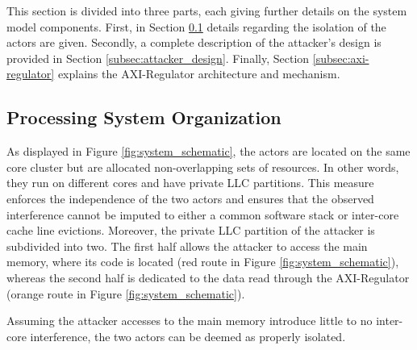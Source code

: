     This section is divided into three parts, each giving further details on the system model components.
    First, in Section \ref{subsec:processing_system_organization} details regarding the isolation of the actors are given.
    Secondly, a complete description of the attacker's design is provided in Section \ref{subsec:attacker_design}.
    Finally, Section \ref{subsec:axi-regulator} explains the AXI-Regulator architecture and mechanism.

    \subsection{Processing System Organization}
        \label{subsec:processing_system_organization}
        As displayed in Figure \ref{fig:system_schematic}, the actors are located on the same core cluster but are allocated non-overlapping sets of resources.
        In other words, they run on different cores and have private LLC partitions.
        This measure enforces the independence of the two actors and ensures that the observed interference cannot be imputed to either a common software stack or inter-core cache line evictions.
        Moreover, the private LLC partition of the attacker is subdivided into two.
        The first half allows the attacker to access the main memory, where its code is located (red route in Figure \ref{fig:system_schematic}), whereas the second half is dedicated to the data read through the AXI-Regulator (orange route in Figure \ref{fig:system_schematic}).

        Assuming the attacker accesses to the main memory introduce little to no inter-core interference, the two actors can be deemed as properly isolated.


